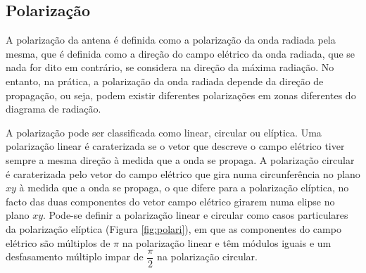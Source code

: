 \subsection*{Polarização}
A polarização da antena é definida como a polarização da onda radiada pela mesma, que é definida como a direção do campo elétrico da onda radiada, que se nada for dito em contrário, se considera na direção da máxima radiação. No entanto, na prática, a polarização da onda radiada depende da direção de propagação, ou seja, podem existir diferentes polarizações em zonas diferentes do diagrama de radiação.\par
A polarização pode ser classificada como linear, circular ou elíptica. Uma polarização linear é caraterizada se o vetor que descreve o campo elétrico tiver sempre a mesma direção à medida que a onda se propaga. A polarização circular é caraterizada pelo vetor do campo elétrico que gira numa circunferência no plano $xy$ à medida que a onda se propaga, o que difere para a polarização elíptica, no facto das duas componentes do vetor campo elétrico girarem numa elipse no plano $xy$. Pode-se definir a polarização linear e circular como casos particulares da polarização elíptica (Figura \ref{fig:polari}), em que as componentes do campo elétrico são múltiplos de $\pi$ na polarização linear e têm módulos iguais e um desfasamento múltiplo impar de $\dfrac{\pi}{2}$ na polarização circular.\par 


